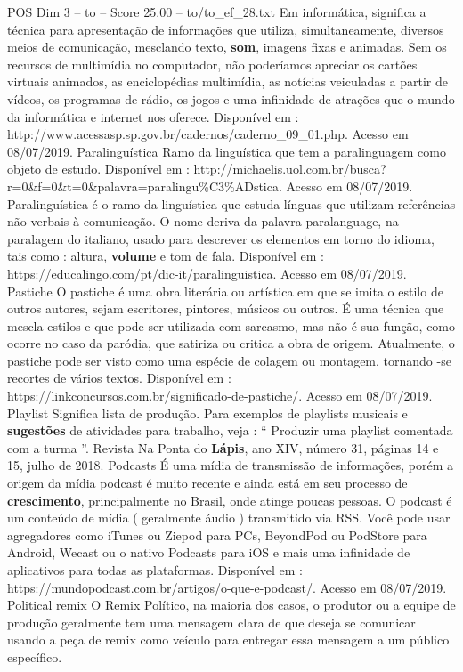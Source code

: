 \begin{textsample}{POS Dim 3 – to – Score 25.00 – to/to\_ef\_28.txt}
Em informática, significa a técnica para apresentação de informações que utiliza, simultaneamente, diversos meios de comunicação, mesclando texto, \textbf{som}, imagens fixas e animadas.
Sem os recursos de multimídia no computador, não poderíamos apreciar os cartões virtuais animados, as enciclopédias multimídia, as notícias veiculadas a partir de vídeos, os programas de rádio, os jogos e uma infinidade de atrações que o mundo da informática e internet nos oferece.
Disponível em : http://www.acessasp.sp.gov.br/cadernos/caderno\_09\_01.php.
Acesso em 08/07/2019.
Paralinguística Ramo da linguística que tem a paralinguagem como objeto de estudo.
Disponível em : http://michaelis.uol.com.br/busca? r=0\&f=0\&t=0\&palavra=paralingu\%C3\%ADstica.
Acesso em 08/07/2019.
Paralinguística é o ramo da linguística que estuda línguas que utilizam referências não verbais à comunicação.
O nome deriva da palavra paralanguage, na paralagem do italiano, usado para descrever os elementos em torno do idioma, tais como : altura, \textbf{volume} e tom de fala.
Disponível em : https://educalingo.com/pt/dic-it/paralinguistica.
Acesso em 08/07/2019.
Pastiche O pastiche é uma obra literária ou artística em que se imita o estilo de outros autores, sejam escritores, pintores, músicos ou outros.
É uma técnica que mescla estilos e que pode ser utilizada com sarcasmo, mas não é sua função, como ocorre no caso da paródia, que satiriza ou critica a obra de origem.
Atualmente, o pastiche pode ser visto como uma espécie de colagem ou montagem, tornando -se recortes de vários textos.
Disponível em : https://linkconcursos.com.br/significado-de-pastiche/.
Acesso em 08/07/2019.
Playlist Significa lista de produção.
Para exemplos de playlists musicais e \textbf{sugestões} de atividades para trabalho, veja : “ Produzir uma playlist comentada com a turma ”.
Revista Na Ponta do \textbf{Lápis}, ano XIV, número 31, páginas 14 e 15, julho de 2018.
Podcasts É uma mídia de transmissão de informações, porém a origem da mídia podcast é muito recente e ainda está em seu processo de \textbf{crescimento}, principalmente no Brasil, onde atinge poucas pessoas.
O podcast é um conteúdo de mídia ( geralmente áudio ) transmitido via RSS.
Você pode usar agregadores como iTunes ou Ziepod para PCs, BeyondPod ou PodStore para Android, Wecast ou o nativo Podcasts para iOS e mais uma infinidade de aplicativos para todas as plataformas.
Disponível em : https://mundopodcast.com.br/artigos/o-que-e-podcast/.
Acesso em 08/07/2019.
Political remix O Remix Político, na maioria dos casos, o produtor ou a equipe de produção geralmente tem uma mensagem clara de que deseja se comunicar usando a peça de remix como veículo para entregar essa mensagem a um público específico.

\end{textsample}
